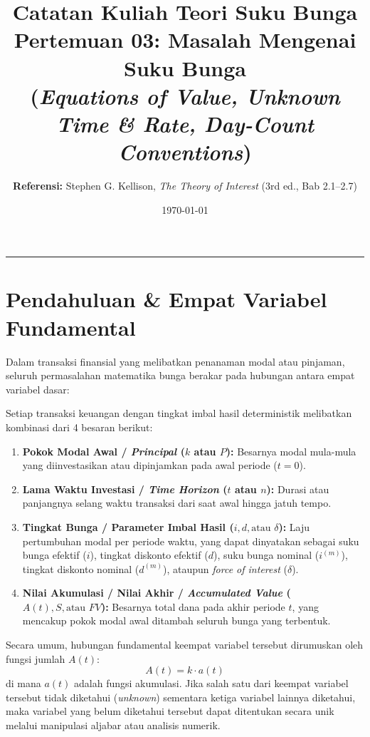 \documentclass[11pt,a4paper]{article}
\title{\textbf{\LARGE Catatan Kuliah Teori Suku Bunga}\\[0.3em]
\Large Pertemuan 03: Masalah Mengenai Suku Bunga\\
\large (\textit{Equations of Value, Unknown Time \& Rate, Day-Count Conventions})}
\author{\textbf{Referensi:} Stephen G. Kellison, \textit{The Theory of Interest} (3rd ed., Bab 2.1--2.7)}
\date{\today}
\begin{document}
\maketitle
\tableofcontents
\vspace{1em}
\hrule
\vspace{1.5em}

\section{Pendahuluan \& Empat Variabel Fundamental}

Dalam transaksi finansial yang melibatkan penanaman modal atau pinjaman, seluruh permasalahan matematika bunga berakar pada hubungan antara empat variabel dasar:

\begin{definitionbox}
Setiap transaksi keuangan dengan tingkat imbal hasil deterministik melibatkan kombinasi dari 4 besaran berikut:
\begin{enumerate}[label=\arabic*.]
    \item \textbf{Pokok Modal Awal / \textit{Principal} ($k$ atau $P$):} Besarnya modal mula-mula yang diinvestasikan atau dipinjamkan pada awal periode ($t=0$).
    \item \textbf{Lama Waktu Investasi / \textit{Time Horizon} ($t$ atau $n$):} Durasi atau panjangnya selang waktu transaksi dari saat awal hingga jatuh tempo.
    \item \textbf{Tingkat Bunga / Parameter Imbal Hasil ($i, d, \text{atau } \delta$):} Laju pertumbuhan modal per periode waktu, yang dapat dinyatakan sebagai suku bunga efektif ($i$), tingkat diskonto efektif ($d$), suku bunga nominal ($i^{(m)}$), tingkat diskonto nominal ($d^{(m)}$), ataupun \textit{force of interest} ($\delta$).
    \item \textbf{Nilai Akumulasi / Nilai Akhir / \textit{Accumulated Value} ($A(t), S, \text{atau } FV$):} Besarnya total dana pada akhir periode $t$, yang mencakup pokok modal awal ditambah seluruh bunga yang terbentuk.
\end{enumerate}
\end{definitionbox}

\begin{notebox}
Secara umum, hubungan fundamental keempat variabel tersebut dirumuskan oleh fungsi jumlah $A(t)$:
\begin{equation}
    A(t) = k \cdot a(t)
\end{equation}
di mana $a(t)$ adalah fungsi akumulasi. Jika salah satu dari keempat variabel tersebut tidak diketahui (\textit{unknown}) sementara ketiga variabel lainnya diketahui, maka variabel yang belum diketahui tersebut dapat ditentukan secara unik melalui manipulasi aljabar atau analisis numerik.
\end{notebox}
\end{document}
